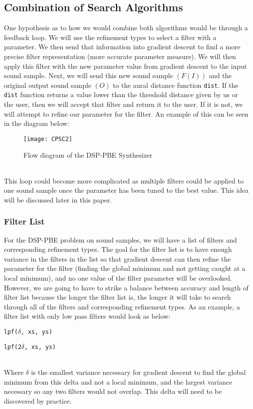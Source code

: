 \documentclass[english, 11pt]{article}
\begin{document}
\subsection{Combination of Search Algorithms}

One hypothesis as to how we would combine both algorithms would be through a feedback loop. We will use the refinement types to select a filter with a parameter. We then send that information into gradient descent to find a more precise filter representation (more accurate parameter measure). We will then apply this filter with the new parameter value from gradient descent to the input sound sample. Next, we will send this new sound sample $(F(I))$ and the original output sound sample $(O)$ to the aural distance function \texttt{dist}. If the \texttt{dist} function returns a value lower than the threshold distance given by us or the user, then we will accept that filter and return it to the user. If it is not, we will attempt to refine our parameter for the filter. An example of this can be seen in the diagram below: 
\begin{figure}[!htb]
\centerline{\texttt{[image: CPSC2]}}
\caption{Flow diagram of the DSP-PBE Synthesizer}\label{fig:image6}
\end{figure}\\ 
This loop could become more complicated as multiple filters could be applied to one sound sample once the parameter has been tuned to the best value. This idea will be discussed later in this paper.

\subsubsection{Filter List}

For the DSP-PBE problem on sound samples, we will have a list of filters and corresponding refinement types. The goal for the filter list is to have enough variance in the filters in the list so that gradient descent can then refine the parameter for the filter (finding the global minimum and not getting caught at a local minimum), and no one value of the filter parameter will be overlooked. However, we are going to have to strike a balance between accuracy and length of filter list because the longer the filter list is, the longer it will take to search through all of the filters and corresponding refinement types. As an example, a filter list with only low pass filters would look as below:

\begin{enumerate}
{\setlength\itemindent{150pt} \item{\texttt{lpf($\delta$, xs, ys)}}}
{\setlength\itemindent{150pt} \item{\texttt{lpf(2$\delta$, xs, ys)}}}
\end{enumerate}
\centerline{\bm{$\vdots$}} ~\\
Where $\delta$ is the smallest variance necessary for gradient descent to find the global minimum from this delta and not a local minimum, and the largest variance necessary so any two filters would not overlap. This delta will need to be discovered by practice. 
\end{document}
